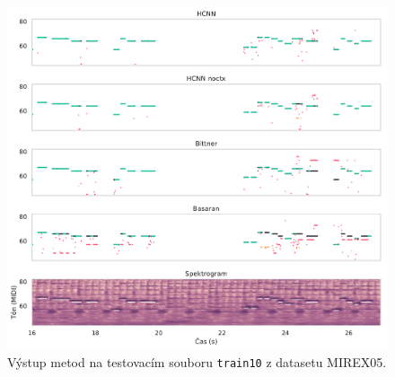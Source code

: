 \begin{figure}[p]\centering
\includegraphics[width=\textwidth,height=\textheight,keepaspectratio]{../img/vysledky/mirex05_train10}
\caption{Výstup metod na testovacím souboru \texttt{train10} z datasetu MIREX05.}
\label{obr:mirex05_train10}
\end{figure}

